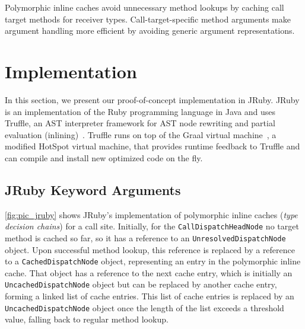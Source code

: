 \documentclass{sigplanconf} %
\begin{document}
Polymorphic inline caches avoid unnecessary method lookups by caching call target methods for receiver types. Call-target-specific method arguments make argument handling more efficient by avoiding generic argument representations.

\section{Implementation}
In this section, we present our proof-of-concept implementation in JRuby. JRuby is an implementation of the Ruby programming language in Java and uses Truffle, an AST interpreter framework for AST node rewriting and partial evaluation (inlining)~\cite{Wurthinger:2013:OVR:2509578.2509581, Wurthinger:2012:SAI:2384577.2384587}. Truffle runs on top of the Graal virtual machine~\cite{Wimmer:2012:TSR:2384716.2384723}, a modified HotSpot virtual machine, that provides runtime feedback to Truffle and can compile and install new optimized code on the fly.

\subsection{JRuby Keyword Arguments}
\autoref{fig:pic_jruby} shows JRuby's implementation of polymorphic inline
caches (\emph{type decision chains}) for a call site. Initially, for the
\lstinline{CallDispatchHeadNode} no target method is cached so far, so it has a reference to an \lstinline{UnresolvedDispatchNode} object. Upon successful method lookup, this reference is replaced by a reference to a \lstinline{CachedDispatchNode} object, representing an entry in the polymorphic inline cache. That object has a reference to the next cache entry, which is initially an \lstinline{UncachedDispatchNode} object but can be replaced by another cache entry, forming a linked list of cache entries. This list of cache entries is replaced by an \lstinline{UncachedDispatchNode} object once the length of the list exceeds a threshold value, falling back to regular method lookup.
\end{document}
